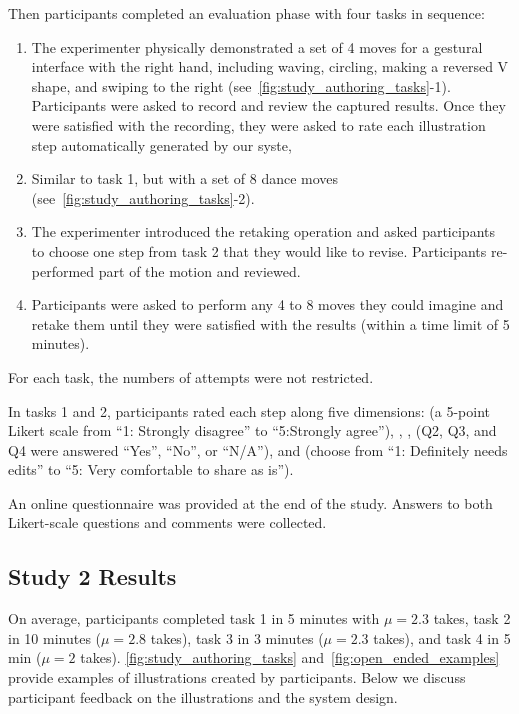 Then participants completed an evaluation phase with four tasks in sequence:
\begin{enumerate}
  \itemsep -2pt
  \item The experimenter physically demonstrated a set of 4 moves for a gestural interface with the right hand, including waving, circling, making a reversed V shape, and swiping to the right (see~\ref{fig:study_authoring_tasks}-1). Participants were asked to record and review the captured results. Once they were satisfied with the recording, they were asked to rate each illustration step automatically generated by our syste,
  \item Similar to task 1, but with a set of 8 dance moves (see~\ref{fig:study_authoring_tasks}-2).
  \item The experimenter introduced the retaking operation and asked participants to choose one step from task 2 that they would like to revise. Participants re-performed part of the motion and reviewed.
  \item Participants were asked to perform any 4 to 8 moves they could imagine and retake them until they were satisfied with the results (within a time limit of 5 minutes).
\end{enumerate}
For each task, the numbers of attempts were not restricted.

%
In tasks 1 and 2, participants rated each step along five dimensions:  (a 5-point Likert scale from ``1: Strongly disagree'' to ``5:Strongly agree''), , ,  (Q2, Q3, and Q4 were answered ``Yes'', ``No'', or ``N/A''), and  (choose from ``1: Definitely needs edits'' to ``5: Very comfortable to share as is'').

An online questionnaire  was provided at the end of the study. Answers to both Likert-scale questions and comments were collected.


\subsection{Study 2 Results}
On average, participants completed task 1 in 5 minutes with $\mu=2.3$ takes, task 2 in 10 minutes ($\mu=2.8$ takes), task 3 in 3 minutes ($\mu=2.3$ takes), and task 4 in 5 min ($\mu=2$ takes).
\ref{fig:study_authoring_tasks} and~\ref{fig:open_ended_examples} provide examples of illustrations created by participants. Below we discuss participant feedback on the illustrations and the system design.


